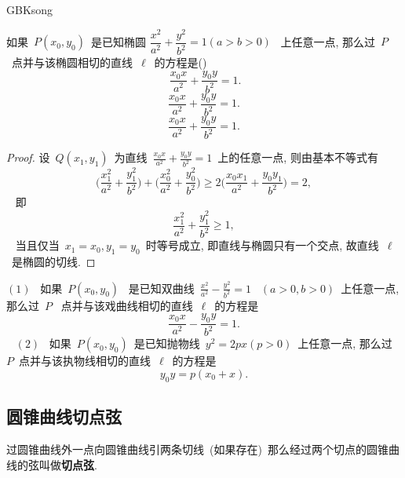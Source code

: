 \documentclass[a4paper, 12pt, twoside]{ctexart}
\begin{document}
\begin{CJK*}{GBK}{song}
    \begin{theo}[椭圆切线方程]
        如果~$P(x_0, y_0)$~是已知椭圆 $\dfrac{x^2}{a^2}+\dfrac{y^2}{b^2}=1(a>b>0)$~ 上任意一点, 那么过~$P$~点并与该椭圆相切的直线~$\ell$~的方程是()
            $$~\frac{x_0x}{a^2}+\frac{y_0y}{b^2}=1.$$
            \[
            \frac{x_0x}{a^2}+\frac{y_0y}{b^2}=1.
            \]
            \begin{equation*}
            \frac{x_0x}{a^2}+\frac{y_0y}{b^2}=1.
            \end{equation*}
    \end{theo}
    \begin{proof}
        设~$Q(x_1, y_1)$~为直线~$\frac{x_0x}{a^2}+\frac{y_0y}{b^2}=1$~上的任意一点, 则由基本不等式有
        $$~\Big(\frac{x_1^2}{a^2}+\frac{y_1^2}{b^2}\Big) +\Big(\frac{x_0^2}{a^2}+\frac{y_0^2}{b^2}\Big) \ge 2\Big(\frac{x_0x_1}{a^2}+\frac{y_0y_1}{b^2}\Big)=2,~$$~
        即
            $$~\frac{x_1^2}{a^2}+\frac{y_1^2}{b^2} \ge 1,~$$~
        当且仅当~$x_1=x_0,y_{1}=y_0$~时等号成立, 即直线与椭圆只有一个交点,  故直线~$\ell$~是椭圆的切线.
    \end{proof}
    \begin{coro}[双曲线和抛物线的切线方程] $(1)$~ 如果~$P(x_0, y_0)$~ 是已知双曲线~$\frac{x^2}{a^2}-\frac{y^2}{b^2}=1$~ $(a>0, b>0)$~上任意一点, 那么过~$P$~ 点并与该戏曲线相切的直线~$\ell$~的方程是
            $$~\frac{x_0x}{a^2}-\frac{y_0y}{b^2}=1.~$$~
        \indent $(2)$~ 如果~$P(x_0, y_0)$~是已知抛物线~$y^2=2px(p>0)$~上任意一点, 那么过~$P$~点并与该执物线相切的直线~$\ell$~的方程是
        $$~y_0y=p(x_0+x).~$$
    \end{coro}
\subsection{圆锥曲线切点弦}
    \begin{defi}[切点弦]
     过圆锥曲线外一点向圆锥曲线引两条切线~(如果存在)~那么经过两个切点的圆锥曲线的弦叫做\textbf{切点弦}.
    \end{defi}


\end{CJK*}
\end{document}
